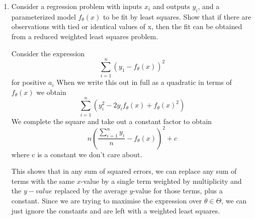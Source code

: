 \documentclass{article}
\newcommand{\chapternumber}{1}
\newenvironment{QandA}{\begin{enumerate}[label=\chapternumber.\arabic*]\bfseries\boldmath}
	{\end{enumerate}}
\newenvironment{answered}{\par\bigskip\normalfont\unboldmath}{}
\begin{document}
\begin{QandA}
	\item Consider a regression problem with inputs $x_i$ and outputs $y_i$, and a
	parameterized model $f_\theta (x)$ to be fit by least squares. Show that if there are
	observations with tied or identical values of x, then the fit can be obtained
	from a reduced weighted least squares problem.
	
	\begin{answered}
		Consider the expression
		\[\sum_{i=1}^n (y_1-f_\theta(x))^2\]
		for positive $a_i$
		When we write this out in full as a quadratic in terms of $f_\theta(x)$ we obtain
		\[\sum_{i=1}^n(y_i^2-2y_if_\theta(x)+f_\theta(x)^2)\]
		We complete the square and take out a constant factor to obtain
		\[n\left(\frac{\sum_{i=1}^ny_i}{n}-f_\theta(x)\right)^2+c\]
		where c is a constant we don't care about.
		
		This shows that in any sum of squared errors, we can replace any sum of terms with the same $x$-value by a single term weighted by multiplicity and the $y-value$ replaced by the average $y$-value for those terms, plus a constant. Since we are trying to maximise the expression over $\theta\in\Theta$, we can just ignore the constants and are left with a weighted least squares.
		
	\end{answered}
	
	\end{QandA}
	
\end{document}
